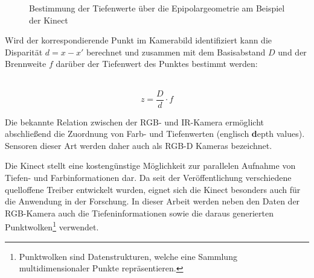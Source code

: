 
\begin{figure}[ht]
	\begin{center}
		\caption{Bestimmung der Tiefenwerte über die Epipolargeometrie am Beispiel der Kinect}
		\label{fig.kinect_depth}
	\end{center}
\end{figure}

\prever{
}

Wird der korrespondierende Punkt im Kamerabild identifiziert kann die Disparität $d = x - x'$ berechnet und zusammen mit dem Basisabstand $D$ und der Brennweite $f$ darüber der Tiefenwert des Punktes bestimmt werden:


\\

\begin{equation}
z = \frac{D}{d}\cdot f
\end{equation}

Die bekannte Relation zwischen der RGB- und IR-Kamera ermöglicht abschließend die Zuordnung von Farb- und Tiefenwerten (englisch \textbf{d}epth values). Sensoren dieser Art werden daher auch als RGB-D Kameras bezeichnet.\\


Die Kinect stellt eine kostengünstige Möglichkeit zur parallelen Aufnahme von Tiefen- und Farbinformationen dar. Da seit der Veröffentlichung verschiedene quelloffene Treiber entwickelt wurden, eignet sich die Kinect besonders auch für die Anwendung in der Forschung. In dieser Arbeit werden neben den Daten der RGB-Kamera auch die Tiefeninformationen sowie die daraus generierten Punktwolken\footnote{Punktwolken sind Datenstrukturen, welche eine Sammlung multidimensionaler Punkte repräsentieren.
} verwendet.

